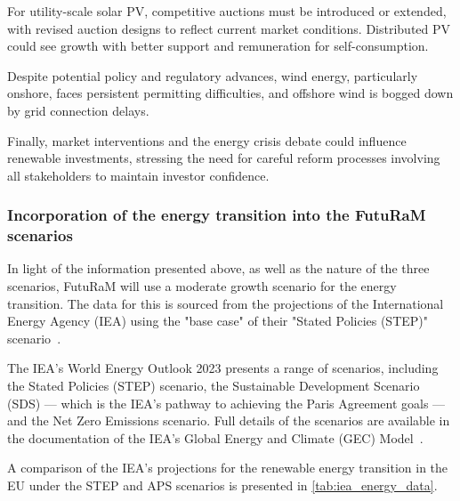 For utility-scale solar PV, competitive auctions must be introduced or extended, with revised auction designs to reflect current market conditions. Distributed PV could see growth with better support and remuneration for self-consumption.

Despite potential policy and regulatory advances, wind energy, particularly onshore, faces persistent permitting difficulties, and offshore wind is bogged down by grid connection delays.

Finally, market interventions and the energy crisis debate could influence renewable investments, stressing the need for careful reform processes involving all stakeholders to maintain investor confidence.

\clearpage
\subsubsection{Incorporation of the energy transition into the FutuRaM scenarios}



In light of the information presented above, as well as the nature of the three scenarios, FutuRaM will use a moderate growth scenario for the energy transition. The data for this is sourced from the projections of the International Energy Agency (IEA) using the "base case" of their "Stated Policies (STEP)" scenario~\cite{iea2022worldenergyoutlookdata}.

The IEA's World Energy Outlook 2023 presents a range of scenarios, including the Stated Policies (STEP) scenario, the Sustainable Development Scenario (SDS) --- which is the IEA's pathway to achieving the Paris Agreement goals --- and the Net Zero Emissions scenario. Full details of the scenarios are available in the documentation of the IEA's Global Energy and Climate (GEC) Model~\cite{iea2023model}.

A comparison of the IEA's projections for the renewable energy transition in the EU under the STEP and APS scenarios is presented in \autoref{tab:iea_energy_data}.

